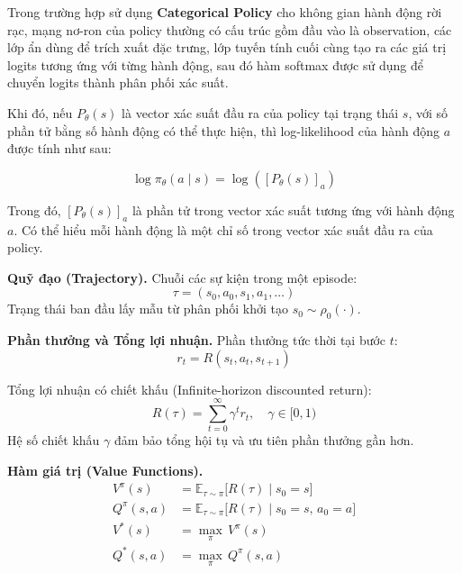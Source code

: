 \begin{itemize}
Trong trường hợp sử dụng \textbf{Categorical Policy} cho không gian hành động rời rạc,
mạng nơ-ron của policy thường có cấu trúc gồm đầu vào là observation, các lớp ẩn dùng
để trích xuất đặc trưng, lớp tuyến tính cuối cùng tạo ra các giá trị logits tương ứng với
từng hành động, sau đó hàm softmax được sử dụng để chuyển logits thành phân phối xác
suất.

Khi đó, nếu $P_\theta(s)$ là vector xác suất đầu ra của policy tại trạng thái $s$, với số
phần tử bằng số hành động có thể thực hiện, thì log-likelihood của hành động $a$ được
tính như sau:

\begin{equation}
    \log \pi_\theta(a \mid s)
    =
    \log \left( [P_\theta(s)]_a \right)
    \label{eq:categorical_log_likelihood}
\end{equation}

Trong đó, $[P_\theta(s)]_a$ là phần tử trong vector xác suất tương ứng với hành động
$a$. Có thể hiểu mỗi hành động là một chỉ số trong vector xác suất đầu ra của policy.

\textbf{Quỹ đạo (Trajectory).}
Chuỗi các sự kiện trong một episode:
\begin{equation}
    \tau = (s_0, a_0, s_1, a_1, \ldots)
\end{equation}
Trạng thái ban đầu lấy mẫu từ phân phối khởi tạo $s_0 \sim \rho_0(\cdot)$.

\textbf{Phần thưởng và Tổng lợi nhuận.}
Phần thưởng tức thời tại bước $t$:
\begin{equation}
    r_t = R(s_t, a_t, s_{t+1})
\end{equation}

Tổng lợi nhuận có chiết khấu (Infinite-horizon discounted return):
\begin{equation}
    R(\tau) = \sum_{t=0}^{\infty} \gamma^t r_t, \quad \gamma \in [0,1)
\end{equation}
Hệ số chiết khấu $\gamma$ đảm bảo tổng hội tụ và ưu tiên phần thưởng gần hơn.

\textbf{Hàm giá trị (Value Functions).}
\begin{align}
    V^\pi(s) &= \mathbb{E}_{\tau \sim \pi}\bigl[R(\tau) \mid s_0 = s\bigr]
    \label{eq:Vpi}\\
    Q^\pi(s,a) &= \mathbb{E}_{\tau \sim \pi}\bigl[R(\tau) \mid s_0=s,\, a_0=a\bigr]
    \label{eq:Qpi}\\
    V^*(s) &= \max_\pi\, V^\pi(s) \label{eq:Vstar}\\
    Q^*(s,a) &= \max_\pi\, Q^\pi(s,a) \label{eq:Qstar}
\end{align}


\end{itemize}

